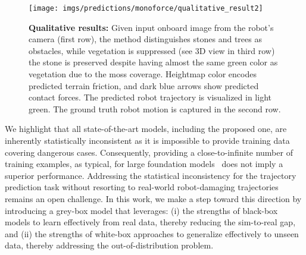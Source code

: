 


\begin{figure}[t!]
  \centering
  \texttt{[image: imgs/predictions/monoforce/qualitative\_result2]}
  \caption{
  \textbf{Qualitative results:} Given input onboard image from the robot's camera (first row), the method distinguishes stones and trees as obstacles, while vegetation is suppressed (see 3D view in third row) the stone is preserved despite having almost the same green color as vegetation due to the moss coverage. Heightmap color encodes predicted terrain friction, and dark blue arrows show predicted contact forces. The predicted robot trajectory is visualized in light green. The ground truth robot motion is captured in the second row.}
  \label{fig:catch-eye2}
\end{figure}

We highlight that all state-of-the-art models, including the proposed one, are inherently statistically inconsistent
as it is impossible to provide training data covering dangerous cases.
Consequently, providing a close-to-infinite number of training examples, as typical,
for large foundation models~\cite{Kirillov-ICCV-2023} does not imply a superior performance.
Addressing the statistical inconsistency for the trajectory prediction task
without resorting to real-world robot-damaging trajectories remains an open challenge.
In this work, we make a step toward this direction by introducing a grey-box model that leverages:
(i) the strengths of black-box models to learn effectively from real data, thereby reducing the sim-to-real gap, and
(ii) the strengths of white-box approaches to generalize effectively to unseen data, thereby addressing the out-of-distribution problem.

